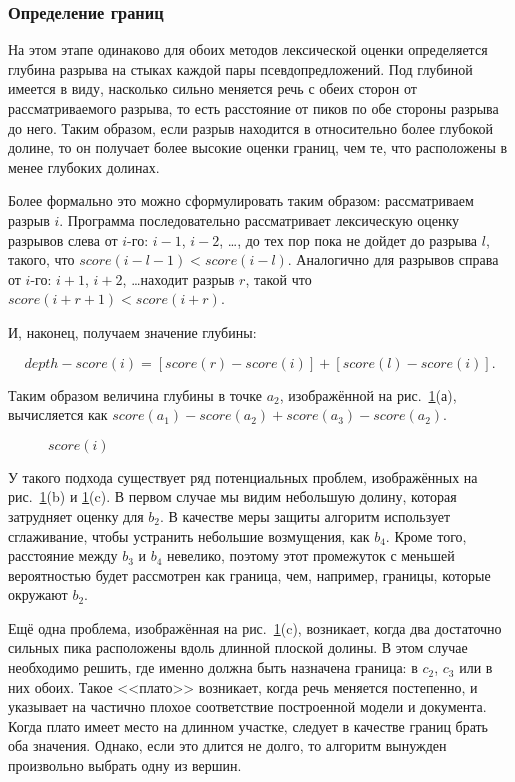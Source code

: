 \documentclass[12pt]{article}
\begin{document}
\subsubsection{Определение границ}
На этом этапе одинаково для обоих методов лексической оценки определяется глубина разрыва на стыках каждой пары псевдопредложений. Под глубиной имеется в виду, насколько сильно меняется речь с обеих сторон от рассматриваемого разрыва, то есть расстояние от пиков по обе стороны разрыва до него. Таким образом, если разрыв находится в относительно более глубокой долине, то он получает более высокие оценки границ, чем те, что расположены в менее глубоких долинах. 
		
Более формально это можно сформулировать таким образом: рассматриваем разрыв $i$. Программа последовательно рассматривает лексическую оценку разрывов слева от $i$-го: $i-1$, $i-2$, \ldots, до тех пор пока не дойдет до разрыва $l$, такого, что $score(i-l-1) < score(i-l)$. Аналогично для разрывов справа от $i$-го: $i+1$, $i+2$, \ldots находит разрыв $r$, такой что $score(i+r+1) < score(i+r)$. 
		
И, наконец, получаем значение глубины: 
\vspace{-35pt}
\begin{center}
	$$depth-score(i) = [score(r) - score(i)] + [score(l) - score(i)].$$
\end{center}
		
Таким образом величина глубины в точке $a_2$, изображённой на \linebreak рис.~\ref{im3}(а), вычисляется как $score(a_1) - score(a_2) + score(a_3) - score(a_2)$.
		
\vspace{5pt}
\begin{figure}[h!]
	\caption{$score(i)$}
	\label{im3}
\end{figure}
\vspace{5pt}
		
У такого подхода существует ряд потенциальных проблем, изображённых на рис.~\ref{im3}(b) и \ref{im3}(c). В первом случае мы видим небольшую долину, которая затрудняет оценку для $b_2$. В качестве меры защиты алгоритм использует сглаживание, чтобы устранить небольшие возмущения, как $b_4$. Кроме того, расстояние между $b_3$ и $b_4$ невелико, поэтому этот промежуток с меньшей вероятностью будет рассмотрен как граница, чем, например, границы, которые окружают $b_2$. 
		
Ещё одна проблема, изображённая на рис.~\ref{im3}(c), возникает, когда два достаточно сильных пика расположены вдоль длинной плоской долины. В этом случае необходимо решить, где именно должна быть назначена граница: в $c_2$, $c_3$ или в них обоих. Такое <<плато>> возникает, когда речь меняется постепенно, и указывает на частично плохое соответствие построенной модели и документа. Когда плато имеет место на длинном участке, следует в качестве границ брать оба значения. Однако, если это длится не долго, то алгоритм вынужден произвольно выбрать одну из вершин. 
		
\end{document}
